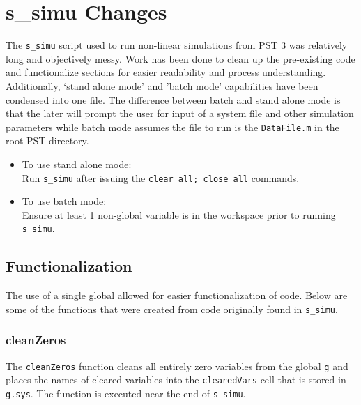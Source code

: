 \pagebreak
\section{s\_simu Changes}
The \verb|s_simu| script used to run non-linear simulations from PST 3 was relatively long and objectively messy.
Work has been done to clean up the pre-existing code and functionalize sections for easier readability and process understanding.
Additionally, `stand alone mode' and 'batch mode' capabilities have been condensed into one file.
The difference between batch and stand alone mode is that the later will prompt the user for input of a system file and other simulation parameters while batch mode assumes the file to run is the \verb|DataFile.m| in the root PST directory.
\begin{itemize}
\item To use stand alone mode:\\
Run \verb|s_simu| after issuing the \verb|clear all; close all| commands.
\item To use batch mode:\\
Ensure at least 1 non-global variable is in the workspace prior to running \verb|s_simu|.
\end{itemize}

\subsection{Functionalization}
The use of a single global allowed for easier functionalization of code.
Below are some of the functions that were created from code originally found in \verb|s_simu|.

\subsubsection{cleanZeros}  
The \verb|cleanZeros| function cleans all entirely zero variables from the global \verb|g| and places the names of cleared variables into the \verb|clearedVars| cell that is stored in \verb|g.sys|.
The function is executed near the end of \verb|s_simu|.

